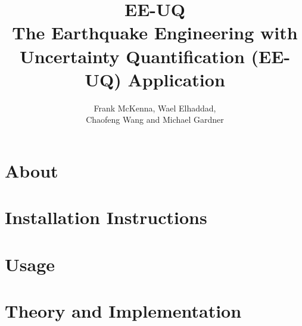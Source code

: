 \documentclass{simcenterdocumentation}
\begin{document}
\title{EE-UQ\\ \Large The Earthquake Engineering with Uncertainty Quantification (EE-UQ) Application}
\author{Frank McKenna, Wael Elhaddad,\\Chaofeng Wang and Michael Gardner}
\newcommand\thisSoftware{EE-UQ }
\newcommand\thisSoftwarePage{https://simcenter.designsafe-ci.org/research-tools/ee-uq-application/}

\hypersetup{pageanchor=false}
\maketitle
\copyrightpage
\acknowledgments

\hypersetup{pageanchor=true}
\begin{frontmatter}

\pagestyle{plain}
{
  \renewcommand{\thispagestyle}[1]{}
  \tableofcontents
  \clearpage
  \listoffigures
  \clearpage
  \listoftables
}

\end{frontmatter}
\pagestyle{somewhatsimple}

\chapter{About}
\label{chap:about}


\chapter{Installation Instructions}
\label{chap:installation}


\chapter{Usage}  \label{usage}
\label{chap:usage}


\chapter{Theory and Implementation}
\label{chap:theory}

\end{document}
